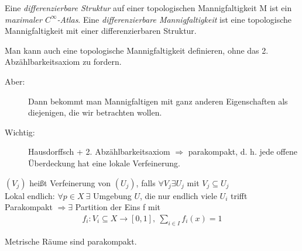 \begin{defs}
Eine \textit{differenzierbare Struktur} auf einer topologischen Mannigfaltigkeit M ist ein \textit{maximaler $C^\infty$-Atlas}. Eine \textit{differenzierbare Mannigfaltigkeit} ist eine topologische Mannigfaltigkeit mit einer differenzierbaren Struktur.
\end{defs}

\begin{bem}
Man kann auch eine topologische Mannigfaltigkeit definieren, ohne das 2. Abzählbarkeitsaxiom zu fordern.
\begin{description}
\item[Aber:] Dann bekommt man Mannigfaltigen mit ganz anderen Eigenschaften als diejenigen, die wir betrachten wollen.
\item[Wichtig:] Hausdorffsch + 2. Abzählbarkeitsaxiom $\Rightarrow$ parakompakt, d. h. jede offene Überdeckung hat eine lokale Verfeinerung.
\end{description}
$(V_j)$ heißt Verfeinerung von $(U_j)$, falls $\forall V_j \exists U_j$ mit $V_j \subseteq U_j$\\
Lokal endlich: $\forall p \in X\ \exists$ Umgebung $U$, die nur endlich viele $U_i$ trifft\\
Parakompakt $\Rightarrow \exists$ Partition der Eins f mit 
\begin{align*}
f_i: V_i \subseteq X \rightarrow [0, 1],\ \sum_{i \in I} f_i (x) = 1
\end{align*} 
\end{bem}

\begin{bsp}
Metrische Räume sind parakompakt.
\end{bsp}

